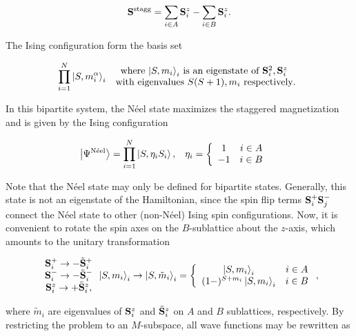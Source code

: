 \documentclass{homework}
\begin{document}
\begin{equation}
    {\bf S}^{\textnormal{stagg}} = \sum_{i \in A} {\bf S}_{i}^z - \sum_{i \in B} {\bf S}_{i}^z.
\end{equation}

The Ising configuration form the basis set 

$$
\prod_{i=1}^{N} \ket{S, m_{i}^\alpha}_{i} \begin{array}{c}
     \textnormal{ where $\ket{S, m_i}_i$ is an eigenstate of ${\bf S}_i^2, {\bf S}_i^z$ } \\
     \textnormal{ with eigenvalues $S(S+1), m_i$ respectively}.
\end{array}
$$

In this bipartite system, the Néel state maximizes the staggered magnetization and is given by the Ising configuration

\begin{align}
    \ket{\Psi^{\textnormal{{Néel}}}} &= \prod_{i=1}^{N} \ket{S, \eta_i S_i}, & \eta_i &= \left\{\begin{array}{cc}
        1 & i \in A  \\
        -1 & i \in B
    \end{array} \right.
\end{align}

Note that the Néel state may only be defined for bipartite states. Generally, this state is not an eigenstate of the Hamiltonian, since the spin flip terms ${\bf S}_i^+ {\bf S}_j^-$
connect the Néel state to other (non-Néel) Ising spin configurations. Now, it is convenient to rotate the spin axes on the $B$-sublattice about the $z$-axis, which amounts to the unitary transformation 

\begin{equation}\begin{array}{c}
     {\bf S}_i^+ \rightarrow - \tilde{{\bf S}}_i^+ \\
     {\bf S}_i^- \rightarrow - \tilde{{\bf S}}_i^- \\
     {\bf S}_i^z \rightarrow + \tilde{{\bf S}}_i^z, 
\end{array}
    \ket{S, m_i}_i \rightarrow \ket{S, \tilde{m}_i}_i = \left\{\begin{array}{cc}
        \ket{S, m_i}_i & i \in A \\
        (1-)^{S+m_i} \ket{S, m_i}_i & i \in B 
    \end{array} \right., 
    \label{HH_su2_rotation}
\end{equation}

where $\tilde{m}_i$ are eigenvalues of ${\bf S}_i^z$ and $\tilde{{\bf S}}_i^z$ on $A$ and $B$ sublattices, respectively. By restricting the problem to an $M$-subspace, all wave functions may be rewritten as 
\end{document}
